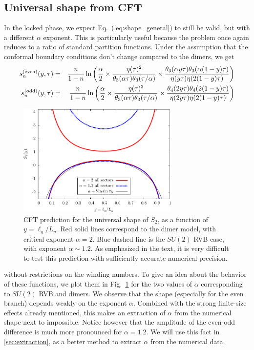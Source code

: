 \documentclass[11pt]{iopart}
\begin{document}
\subsection{Universal shape from CFT}
\label{sec:sun_cft}
In the locked phase, we expect Eq.~(\ref{eq:shape_general}) to still be valid, but with a different $\alpha$ exponent. This is particularly useful because the problem once again reduces to a ratio of standard partition functions. Under the assumption that the conformal boundary conditions don't change compared to the dimers, we get 
\begin{eqnarray}\label{eq:cft_prediction_gen}
 s_n^{\rm (even)}(y,\tau)&=&\frac{n}{1-n}\ln \left(\frac{\alpha}{2}\times\frac{\eta(\tau)^2}{\theta_3(\alpha\tau)\theta_3(\tau/\alpha)}\times\frac{\theta_3(\alpha y \tau)\theta_3(\alpha(1-y)\tau)}{\eta(y\tau)\eta(2(1-y)\tau)}\right)\\
 s_n^{\rm (odd)}(y,\tau)&=&\frac{n}{1-n}\ln \left(\frac{\alpha}{2}\times\frac{\eta(\tau)^2}{\theta_3(\alpha\tau)\theta_3(\tau/\alpha)}\times\frac{\theta_4(2y \tau)\theta_4(2(1-y)\tau)}{\eta(2y\tau)\eta(2(1-y)\tau)}\right)
\end{eqnarray}
\begin{figure}[ht]
 \begin{center}
  \includegraphics[width=8cm]{./figures/SUN_CFT.pdf}
 \end{center}
\caption{CFT prediction for the universal shape of $S_2$, as a function of $y=\ell_y/L_y$. Red solid lines correspond to the dimer model, with critical exponent $\alpha=2$. Blue dashed line is the $SU(2)$ RVB case, with exponent $\alpha\sim 1.2$. As emphasized in the text, it is very difficult to test this prediction with sufficiently accurate numerical precision.}
\label{fig:SUN_CFT}
\end{figure}
without restrictions on the winding numbers. To give an idea about the behavior of these functions, we plot them in Fig.~\ref{fig:SUN_CFT} for the two values of $\alpha$ corresponding to $SU(2)$ RVB and dimers. We observe that the shape (especially for the even branch) depends weakly on the exponent $\alpha$. Combined with the strong finite-size effects already mentioned, this makes an extraction of $\alpha$ from the numerical shape next to impossible. Notice however that the amplitude of the even-odd difference is much more pronounced for $\alpha=1.2$. We will use this fact in \ref{sec:extraction}, as a better method to extract $\alpha$ from the numerical data. 
\end{document}
